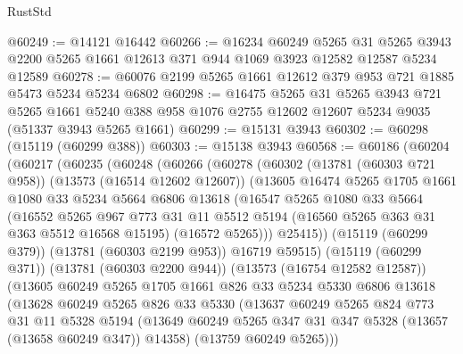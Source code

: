 \begin{lexlean}{RustStd}
\begin{coremodule}
@60249 := @14121 @16442
@60266 := @16234
    @60249
    @5265
    @31
    @5265
    @3943
    @2200
    @5265
    @1661
    @12613
    @371
    @944
    @1069
    @3923
    @12582
    @12587
    @5234
    @12589
@60278 := @60076 @2199 @5265 @1661 @12612 @379 @953 @721 @1885 @5473 @5234 @5234 @6802
@60298 := @16475
    @5265
    @31
    @5265
    @3943
    @721
    @5265
    @1661
    @5240
    @388
    @958
    @1076
    @2755
    @12602
    @12607
    @5234
    @9035
    (@51337 @3943 @5265 @1661)
@60299 := @15131 @3943
@60302 := @60298 (@15119 (@60299 @388))
@60303 := @15138 @3943
@60568 := @60186
    (@60204
      (@60217
        (@60235
          (@60248
            (@60266
              (@60278
                (@60302
                  (@13781 (@60303 @721 @958))
                  (@13573 (@16514 @12602 @12607))
                  (@13605
                    @16474
                    @5265
                    @1705
                    @1661
                    @1080
                    @33
                    @5234
                    @5664
                    @6806
                    @13618
                    (@16547
                      @5265
                      @1080
                      @33
                      @5664
                      (@16552
                        @5265
                        @967
                        @773
                        @31
                        @11
                        @5512
                        @5194
                        (@16560 @5265 @363 @31 @363 @5512 @16568 @15195)
                        (@16572 @5265)))
                    @25415))
                (@15119 (@60299 @379))
                (@13781 (@60303 @2199 @953))
                @16719
                @59515)
              (@15119 (@60299 @371))
              (@13781 (@60303 @2200 @944))
              (@13573 (@16754 @12582 @12587))
              (@13605
                @60249
                @5265
                @1705
                @1661
                @826
                @33
                @5234
                @5330
                @6806
                @13618
                (@13628
                  @60249
                  @5265
                  @826
                  @33
                  @5330
                  (@13637
                    @60249
                    @5265
                    @824
                    @773
                    @31
                    @11
                    @5328
                    @5194
                    (@13649 @60249 @5265 @347 @31 @347 @5328 (@13657 (@13658 @60249 @347)) @14358)
                    (@13759 @60249 @5265)))

\end{coremodule}
\end{lexlean}
